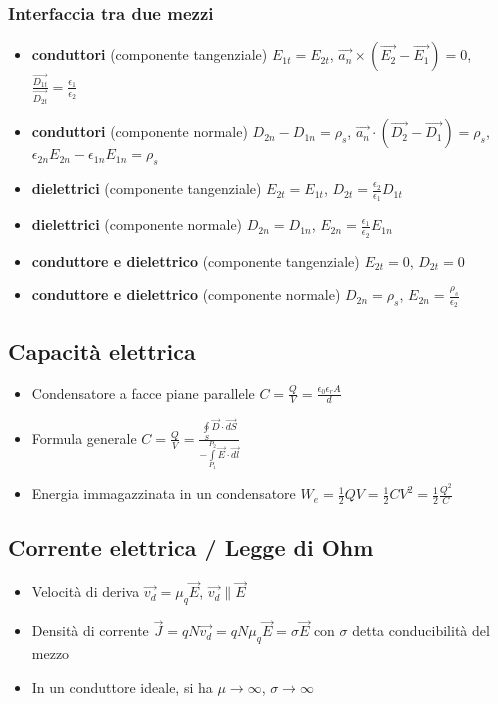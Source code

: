 \documentclass{article}
\begin{document}
\subsubsection{Interfaccia tra due mezzi}
\begin{itemize}
	\item \textbf{conduttori} (componente tangenziale) \(E_{1t} = E_{2t}\), \(\vec{a_n} \times (\vec{E_2} - \vec{E_1}) = 0 \), \( \frac{\vec{D_{1t}}}{\vec{D_{2t}}} = \frac{\epsilon_1}{\epsilon_2} \)
	\item \textbf{conduttori} (componente normale) \( D_{2n} - D_{1n} = \rho_s \), \(\vec{a_n} \cdot (\vec{D_2} - \vec{D_1}) = \rho_s \), \(\epsilon_{2n} E_{2n} - \epsilon_{1n} E_{1n} = \rho_s \)
	\item \textbf{dielettrici} (componente tangenziale) \( E_{2t} = E_{1t} \), \( D_{2t} = \frac{\epsilon_2}{\epsilon_1} D_{1t} \)
	\item \textbf{dielettrici} (componente normale) \( D_{2n} = D_{1n} \), \( E_{2n} = \frac{\epsilon_1}{\epsilon_2} E_{1n} \)
	\item \textbf{conduttore e dielettrico} (componente tangenziale) \( E_{2t} = 0\), \(D_{2t} = 0\)
	\item \textbf{conduttore e dielettrico} (componente normale) \( D_{2n} = \rho_s \), \( E_{2n} = \frac{\rho_s}{\epsilon_2} \)
\end{itemize}

\subsection{Capacità elettrica}
\begin{itemize}
	\item Condensatore a facce piane parallele \( C = \frac{Q}{V} = \frac{\epsilon_0 \epsilon_r A}{d} \)
	\item Formula generale \(C = \frac{Q}{V} = \frac{\oint\limits_{S}\vec{D} \cdot \vec{dS}}{-\int\limits_{P_1}^{P_2} \vec{E} \cdot \vec{dl}} \)
	\item Energia immagazzinata in un condensatore \(W_e = \frac{1}{2} Q V = \frac{1}{2} C V^2 = \frac{1}{2} \frac{Q^2}{C} \)
\end{itemize}

\subsection{Corrente elettrica / Legge di Ohm}
\begin{itemize}
	\item Velocità di deriva \(\vec{v_d} = \mu_q \vec{E} \), \( \vec{v_d} \| \vec{E} \)
	\item Densità di corrente \( \vec{J} = qN \vec{v_d} = qN \mu_q \vec{E} = \sigma \vec{E} \) con \(\sigma\) detta conducibilità del mezzo
	\item In un conduttore ideale, si ha \(\mu \rightarrow \infty\), \(\sigma \rightarrow \infty \)
\end{itemize}
\end{document}
